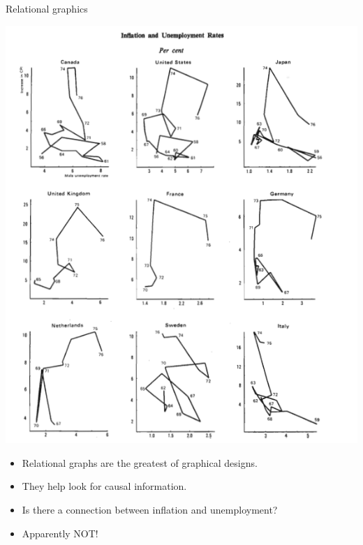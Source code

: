 \documentclass[
  ignorenonframetext,
]{beamer}
\begin{document}
\begin{frame}{Relational graphics}
\protect\hypertarget{relational-graphics-3}{}
\begin{minipage}{0.45\textwidth}
\centering
\includegraphics[width=\textwidth]{excellence_figs/fig_26.png}
\end{minipage}
\hfill
\begin{minipage}{0.5\textwidth}
\footnotesize
\begin{itemize}
  \item Relational graphs are the greatest of graphical designs.
  \item They help look for causal information.
  \item Is there a connection between inflation and unemployment?
  \item Apparently NOT!
\end{itemize}
\end{minipage}
\end{frame}
\end{document}
